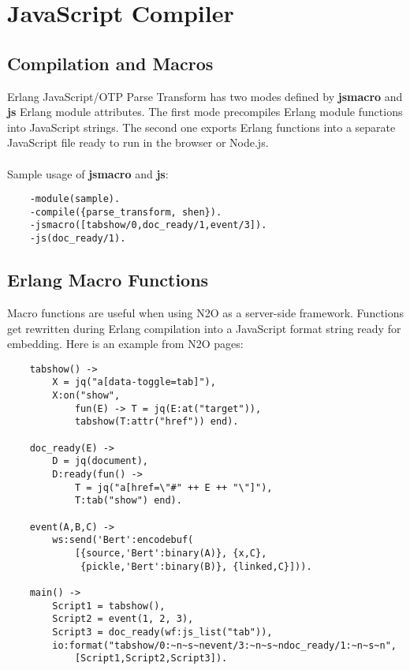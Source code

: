 \section{JavaScript Compiler}

\subsection{Compilation and Macros}
Erlang JavaScript/OTP Parse Transform has two modes defined
by {\bf \-jsmacro} and {\bf \-js} Erlang module attributes.
The first mode precompiles Erlang module functions
into JavaScript strings. The second one exports Erlang functions
into a separate JavaScript file ready to run in the browser or Node.js.

\paragraph{}
Sample usage of {\bf \-jsmacro} and {\bf \-js}:

\begin{lstlisting}
    -module(sample).
    -compile({parse_transform, shen}).
    -jsmacro([tabshow/0,doc_ready/1,event/3]).
    -js(doc_ready/1).
\end{lstlisting}

\subsection{Erlang Macro Functions}
Macro functions are useful when using N2O as a server-side framework.
Functions get rewritten during Erlang compilation into a JavaScript format
string ready for embedding. Here is an example from N2O pages:

\begin{lstlisting}
    tabshow() ->
        X = jq("a[data-toggle=tab]"),
        X:on("show",
            fun(E) -> T = jq(E:at("target")),
            tabshow(T:attr("href")) end).

    doc_ready(E) ->
        D = jq(document),
        D:ready(fun() ->
            T = jq("a[href=\"#" ++ E ++ "\"]"),
            T:tab("show") end).

    event(A,B,C) ->
        ws:send('Bert':encodebuf(
            [{source,'Bert':binary(A)}, {x,C},
             {pickle,'Bert':binary(B)}, {linked,C}])).

    main() ->
        Script1 = tabshow(),
        Script2 = event(1, 2, 3),
        Script3 = doc_ready(wf:js_list("tab")),
        io:format("tabshow/0:~n~s~nevent/3:~n~s~ndoc_ready/1:~n~s~n",
            [Script1,Script2,Script3]).
\end{lstlisting}

